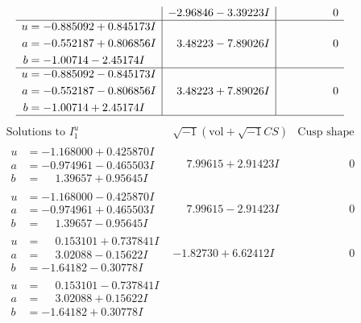 \documentclass[1p]{elsarticle_modified}
\theoremstyle{definition}
\newcommand{\I}{\sqrt{-1}}
\begin{document}
$$\begin{array}{c|c|c}
 & -2.96846 - 3.39223 I & \phantom{-0.000000 } 0 \\ \hline\begin{aligned}
u &= -0.885092 + 0.845173 I \\
a &= -0.552187 + 0.806856 I \\
b &= -1.00714 - 2.45174 I\end{aligned}
 & \phantom{-}3.48223 - 7.89026 I & \phantom{-0.000000 } 0 \\ \hline\begin{aligned}
u &= -0.885092 - 0.845173 I \\
a &= -0.552187 - 0.806856 I \\
b &= -1.00714 + 2.45174 I\end{aligned}
 & \phantom{-}3.48223 + 7.89026 I & \phantom{-0.000000 } 0\\
 \hline 
 \end{array}$$\newpage$$\begin{array}{c|c|c}  
\text{Solutions to }I^u_{1}& \I (\text{vol} + \sqrt{-1}CS) & \text{Cusp shape}\\
 \hline 
\begin{aligned}
u &= -1.168000 + 0.425870 I \\
a &= -0.974961 - 0.465503 I \\
b &= \phantom{-}1.39657 + 0.95645 I\end{aligned}
 & \phantom{-}7.99615 + 2.91423 I & \phantom{-0.000000 } 0 \\ \hline\begin{aligned}
u &= -1.168000 - 0.425870 I \\
a &= -0.974961 + 0.465503 I \\
b &= \phantom{-}1.39657 - 0.95645 I\end{aligned}
 & \phantom{-}7.99615 - 2.91423 I & \phantom{-0.000000 } 0 \\ \hline\begin{aligned}
u &= \phantom{-}0.153101 + 0.737841 I \\
a &= \phantom{-}3.02088 - 0.15622 I \\
b &= -1.64182 - 0.30778 I\end{aligned}
 & -1.82730 + 6.62412 I & \phantom{-0.000000 } 0 \\ \hline\begin{aligned}
u &= \phantom{-}0.153101 - 0.737841 I \\
a &= \phantom{-}3.02088 + 0.15622 I \\
b &= -1.64182 + 0.30778 I\end{aligned}

\end{array}$$
\end{document}

